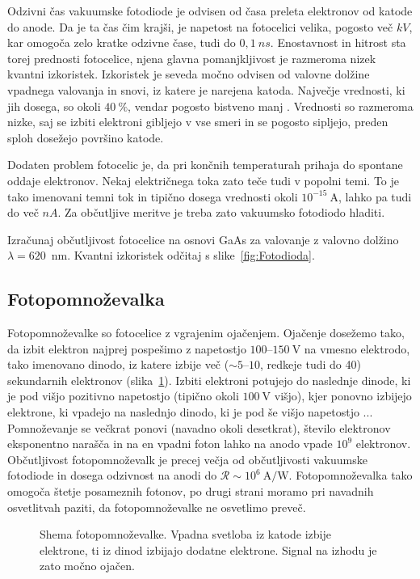 Odzivni čas vakuumske fotodiode je odvisen od časa preleta elektronov od katode do anode. 
Da je ta čas čim krajši, je napetost na fotocelici velika, pogosto več $\si{kV}$,
kar omogoča zelo kratke odzivne čase, tudi do $0,1~\si{ns}$. 
Enostavnost in hitrost sta torej prednosti fotocelice, 
njena glavna pomanjkljivost je razmeroma nizek kvantni izkoristek. 
Izkoristek je seveda močno odvisen od valovne dolžine vpadnega valovanja in snovi, iz 
katere je narejena katoda. Največje vrednosti, ki jih dosega, so okoli $40~\%$, vendar
pogosto bistveno manj . 
Vrednosti so razmeroma nizke, saj se izbiti elektroni gibljejo v vse
smeri in se pogosto sipljejo, preden sploh dosežejo površino katode. 

Dodaten problem fotocelic je, da pri končnih temperaturah prihaja do spontane oddaje elektronov.
Nekaj električnega toka zato teče tudi v popolni temi. To je tako imenovani temni 
tok 
in tipično dosega vrednosti okoli $10^{-15}~\si{\ampere}$, lahko pa tudi do več $\si{nA}$. 
Za občutljive meritve je treba zato vakuumsko fotodiodo hladiti. 

\begin{naloga}
Izračunaj občutljivost fotocelice na osnovi GaAs 
za valovanje z valovno dolžino $\lambda=620$~nm.
Kvantni izkoristek odčitaj s slike~\ref{fig:Fotodioda}.
\end{naloga}

\subsection*{Fotopomnoževalka}
Fotopomnoževalke so fotocelice z vgrajenim ojačenjem. Ojačenje dosežemo tako, da 
izbit elektron najprej pospešimo z napetostjo $100$--$150~\si{\volt}$ na vmesno elektrodo, 
tako imenovano dinodo, iz katere izbije več ($\sim 5$--$10$, redkeje tudi do 40) 
sekundarnih elektronov (slika~\ref{fig:PMT}). 
Izbiti elektroni 
potujejo do naslednje dinode, ki je pod višjo pozitivno napetostjo (tipično okoli $100~\si{\volt}$
višjo), kjer ponovno izbijejo elektrone, ki vpadejo na naslednjo dinodo, 
ki je pod še višjo napetostjo ... 
Pomnoževanje se večkrat ponovi (navadno okoli desetkrat),
število elektronov eksponentno narašča in na en vpadni foton lahko na anodo vpade $10^9$ elektronov. 
Občutljivost fotopomnoževalk je  precej večja od občutljivosti vakuumske fotodiode in
dosega odzivnost na anodi do $\mathcal{R}\sim 10^6~\si{\ampere/\watt}$.
Fotopomnoževalka tako omogoča štetje posameznih fotonov, po drugi strani moramo pri 
navadnih osvetlitvah paziti, da fotopomnoževalke ne osvetlimo preveč. 
\begin{figure}[h]
\centering
\def\svgwidth{80truemm} 

\caption{Shema fotopomnoževalke. Vpadna svetloba iz katode izbije elektrone, ti 
iz dinod izbijajo dodatne elektrone. Signal na izhodu je zato močno ojačen. }
\label{fig:PMT}
\end{figure}


